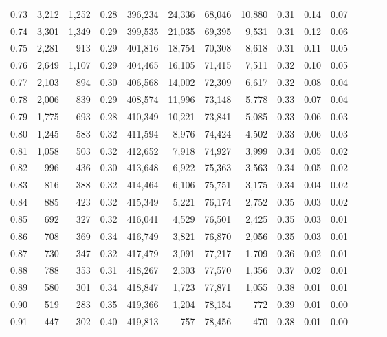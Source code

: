 \begin{tabular}{rrrrrrrrrrrrrr}
0.73 &  3,212 &  1,252 &  0.28 &  396,234 &   24,336 &  68,046 &  10,880 &  0.31 &  0.14 &      0.07 \\
0.74 &  3,301 &  1,349 &  0.29 &  399,535 &   21,035 &  69,395 &   9,531 &  0.31 &  0.12 &      0.06 \\
0.75 &  2,281 &    913 &  0.29 &  401,816 &   18,754 &  70,308 &   8,618 &  0.31 &  0.11 &      0.05 \\
0.76 &  2,649 &  1,107 &  0.29 &  404,465 &   16,105 &  71,415 &   7,511 &  0.32 &  0.10 &      0.05 \\
0.77 &  2,103 &    894 &  0.30 &  406,568 &   14,002 &  72,309 &   6,617 &  0.32 &  0.08 &      0.04 \\
0.78 &  2,006 &    839 &  0.29 &  408,574 &   11,996 &  73,148 &   5,778 &  0.33 &  0.07 &      0.04 \\
0.79 &  1,775 &    693 &  0.28 &  410,349 &   10,221 &  73,841 &   5,085 &  0.33 &  0.06 &      0.03 \\
0.80 &  1,245 &    583 &  0.32 &  411,594 &    8,976 &  74,424 &   4,502 &  0.33 &  0.06 &      0.03 \\
0.81 &  1,058 &    503 &  0.32 &  412,652 &    7,918 &  74,927 &   3,999 &  0.34 &  0.05 &      0.02 \\
0.82 &    996 &    436 &  0.30 &  413,648 &    6,922 &  75,363 &   3,563 &  0.34 &  0.05 &      0.02 \\
0.83 &    816 &    388 &  0.32 &  414,464 &    6,106 &  75,751 &   3,175 &  0.34 &  0.04 &      0.02 \\
0.84 &    885 &    423 &  0.32 &  415,349 &    5,221 &  76,174 &   2,752 &  0.35 &  0.03 &      0.02 \\
0.85 &    692 &    327 &  0.32 &  416,041 &    4,529 &  76,501 &   2,425 &  0.35 &  0.03 &      0.01 \\
0.86 &    708 &    369 &  0.34 &  416,749 &    3,821 &  76,870 &   2,056 &  0.35 &  0.03 &      0.01 \\
0.87 &    730 &    347 &  0.32 &  417,479 &    3,091 &  77,217 &   1,709 &  0.36 &  0.02 &      0.01 \\
0.88 &    788 &    353 &  0.31 &  418,267 &    2,303 &  77,570 &   1,356 &  0.37 &  0.02 &      0.01 \\
0.89 &    580 &    301 &  0.34 &  418,847 &    1,723 &  77,871 &   1,055 &  0.38 &  0.01 &      0.01 \\
0.90 &    519 &    283 &  0.35 &  419,366 &    1,204 &  78,154 &     772 &  0.39 &  0.01 &      0.00 \\
0.91 &    447 &    302 &  0.40 &  419,813 &      757 &  78,456 &     470 &  0.38 &  0.01 &      0.00 \\

\end{tabular}
